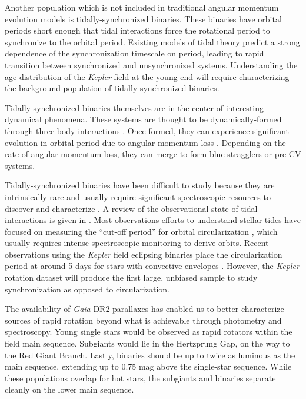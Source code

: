 \documentclass[manuscript]{aastex6}
\newcommand{\Kepler}{\mbox{\textit{Kepler}}}
\newcommand{\Gaia}{\mbox{\textit{Gaia}}}
\begin{document}
Another population which is not included in traditional angular momentum
evolution models is tidally-synchronized binaries. These binaries have orbital 
periods short enough that tidal interactions force the rotational period to
synchronize to the orbital period. Existing models of tidal theory 
\citep{Zahn77} predict a strong dependence of the synchronization timescale 
on period, leading to rapid transition between
synchronized and unsynchronized systems. Understanding the 
age distribution of the \Kepler{} field at the young end will require 
characterizing the background population of tidally-synchronized binaries.

Tidally-synchronized binaries themselves are in the center of interesting
dynamical phenomena. These systems are thought to be dynamically-formed 
through three-body interactions \citep{Tokovinin06, Fabrycky07}. Once formed, they can experience significant
evolution in orbital period due to angular momentum loss \citep{Andronov06}.
Depending on the rate of angular momentum loss, they can merge to form blue 
stragglers or pre-CV systems.

Tidally-synchronized binaries have been difficult to study because they are 
intrinsically rare and usually require significant spectroscopic resources 
to discover and characterize \citep{Mathieu90, Raghavan10, Geller15}. A review 
of the observational state of tidal interactions is given in \citet{Mazeh08}. 
Most observations efforts to understand stellar tides have focused on 
measuring the ``cut-off period'' for orbital circularization \citep{Mayor84},
which usually requires intense spectroscopic monitoring to derive orbits.
Recent observations using the \Kepler{} field eclipsing binaries place the 
circularization period at around 5 days for stars with convective envelopes 
\citep{VanEylen16}. However, the \Kepler{} rotation dataset will produce the
first large, unbiased sample to study synchronization as opposed to
circularization. 

The availability of \Gaia{} DR2 parallaxes \citep{Gaia18,Lindegren18} has
enabled us to better characterize sources of rapid rotation beyond what is
achievable through photometry and spectroscopy. Young single stars would be
observed as rapid rotators within the field main sequence. Subgiants would lie 
in the Hertzprung Gap, on the way to the Red Giant Branch. Lastly, binaries 
should be up to twice as luminous as the main sequence, extending up to 0.75 
mag above the single-star sequence.  While these populations overlap for hot 
stars, the subgiants and binaries separate cleanly on the lower main sequence.
\end{document}
